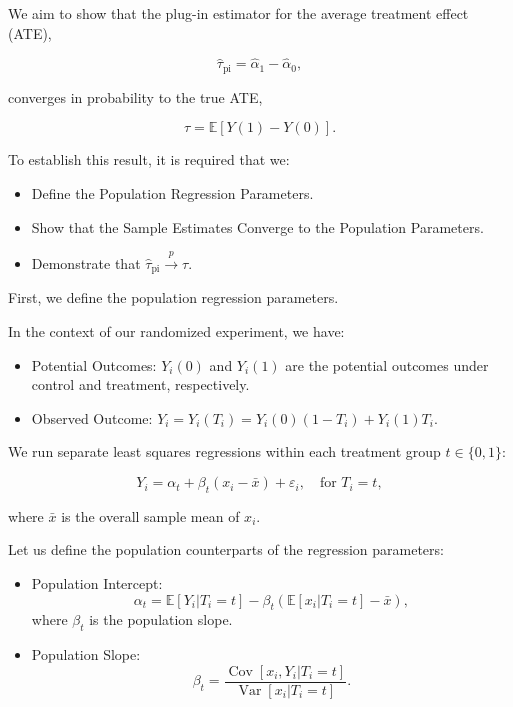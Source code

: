 \documentclass{article}
\begin{document}
We aim to show that the plug-in estimator for the average treatment effect (ATE),

\[
\hat{\tau}_{\text{pi}} = \hat{\alpha}_1 - \hat{\alpha}_0,
\]

converges in probability to the true ATE,

\[
\tau = \mathbb{E}[Y(1) - Y(0)].
\]

To establish this result, it is required that we:

\begin{itemize}
    \item Define the Population Regression Parameters.
    \item Show that the Sample Estimates Converge to the Population Parameters.
    \item Demonstrate that \(\hat{\tau}_{\text{pi}} \xrightarrow{p} \tau\).
\end{itemize}

First, we define the population regression parameters.

In the context of our randomized experiment, we have:

\begin{itemize}
  \item Potential Outcomes: \(Y_i(0)\) and \(Y_i(1)\) are the potential outcomes under control and treatment, respectively.
  \item Observed Outcome: \(Y_i = Y_i(T_i) = Y_i(0)(1 - T_i) + Y_i(1) T_i\).
\end{itemize}

We run separate least squares regressions within each treatment group \(t \in \{0, 1\}\):

\[
Y_i = \alpha_t + \beta_t (x_i - \bar{x}) + \varepsilon_i, \quad \text{for } T_i = t,
\]

where \(\bar{x}\) is the overall sample mean of \(x_i\).

Let us define the population counterparts of the regression parameters:

\begin{itemize}
  \item Population Intercept:
  \[
  \alpha_t = \mathbb{E}[Y_i | T_i = t] - \beta_t \left( \mathbb{E}[x_i | T_i = t] - \bar{x} \right),
  \]
  where \(\beta_t\) is the population slope.
  \item Population Slope:
  \[
  \beta_t= \frac{\operatorname{Cov}[x_i, Y_i | T_i = t]}{\operatorname{Var}[x_i | T_i = t]}.
  \]
\end{itemize}
\end{document}
